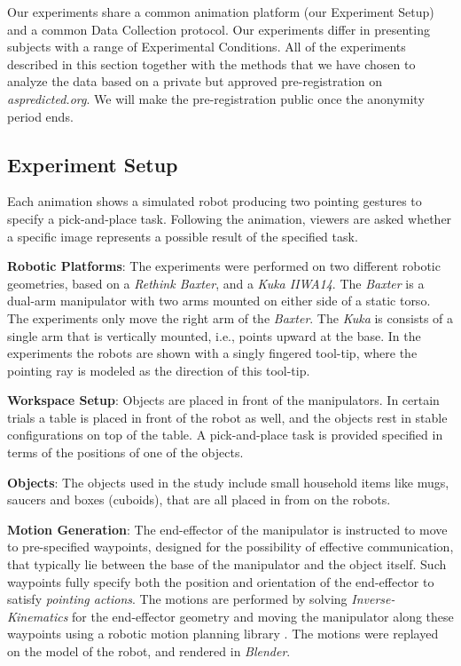 Our experiments share a common animation platform (our Experiment Setup) and a common Data Collection protocol.  Our experiments differ in presenting subjects with a range of Experimental Conditions.  All of the experiments described in this section together with the methods that we have chosen to analyze the data based on a private but approved pre-registration on \textit{aspredicted.org}. We will make the pre-registration public once the anonymity period ends.

\subsection{Experiment Setup}
Each animation shows a simulated robot producing two pointing gestures to specify a pick-and-place task.  Following the animation, viewers are asked whether a specific image represents a possible result of the specified task.

\noindent\textbf{Robotic Platforms}: The experiments were performed on two different robotic geometries, based on a \textit{Rethink Baxter}, and a \textit{Kuka IIWA14}.  The \textit{Baxter} is a dual-arm manipulator with two arms mounted on either side of a static torso. The experiments only move the right arm of the \textit{Baxter}. The \textit{Kuka} is consists of a single arm that is vertically mounted, i.e., points upward at the base. In the experiments the robots are shown with a singly fingered tool-tip, where the pointing ray is modeled as the direction of this tool-tip.

\noindent\textbf{Workspace Setup}: Objects are placed in front of the manipulators. In certain trials a table is placed in front of the robot as well, and the objects rest in stable configurations on top of the table. A pick-and-place task is provided specified in terms of the positions of one of the objects. 

\noindent\textbf{Objects}: The objects used in the study include small household items like mugs, saucers and boxes (cuboids), that are all placed in from on the robots.

\noindent\textbf{Motion Generation}: The end-effector of the manipulator is instructed to move to pre-specified waypoints, designed for the possibility of effective communication, that typically lie between the base of the manipulator and the object itself. Such waypoints fully specify both the position and orientation of the end-effector to satisfy \textit{pointing actions}. The motions are performed by solving \textit{Inverse-Kinematics} for the end-effector geometry and moving the manipulator along these waypoints using a robotic motion planning library .
The motions were replayed on the model of the robot, and rendered in \textit{Blender}.

